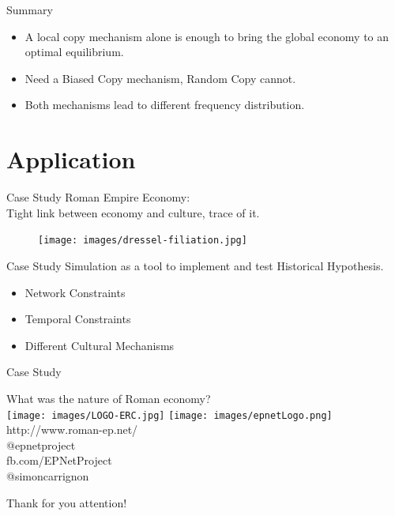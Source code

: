 \documentclass[12pt, handout=show,notes=show]{beamer}
\begin{document}
\begin{frame}{Summary}
\begin{itemize}
	\item A local copy mechanism alone is enough to bring the global economy to an optimal equilibrium.
		\vfill
	\item Need a Biased Copy mechanism, Random Copy cannot.
		\vfill
	\item Both mechanisms lead to different frequency distribution.
		\vfill
\end{itemize}

\end{frame}

\section{Application}
\begin{frame}{Case Study}
	Roman Empire Economy: \\
	Tight link between economy and culture, trace of it. \\
	\begin{figure}
		\texttt{[image: images/dressel-filiation.jpg]}
	\end{figure}
	
\end{frame}

\begin{frame}{Case Study}
	Simulation as a tool to implement and test Historical Hypothesis.
	\begin{itemize}
	\item Network Constraints
	\item Temporal Constraints
	\item Different Cultural Mechanisms
	\end{itemize}
\end{frame}
\begin{frame}{Case Study}
	\begin{center}
		\Large
		What was the nature of Roman economy?\\
		\texttt{[image: images/LOGO-ERC.jpg]} \hfil	\texttt{[image: images/epnetLogo.png]}\\
		\vspace{1cm}
		\scriptsize
			http://www.roman-ep.net/\\
			@epnetproject\\
			fb.com/EPNetProject\\
			@simoncarrignon
	\end{center}


\end{frame}

\begin{frame}
    \Huge
    Thank for you attention!
\end{frame}
\end{document}
